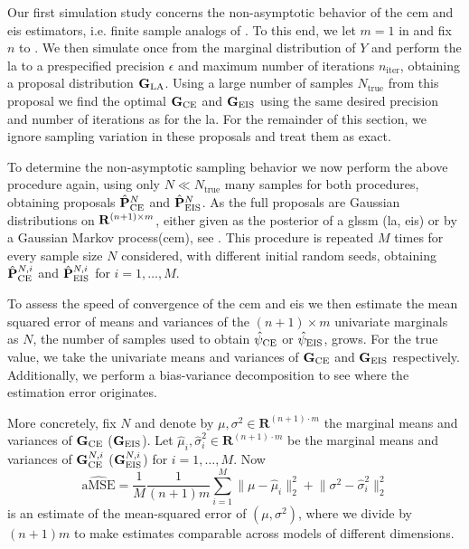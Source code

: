 
Our first simulation study concerns the non-asymptotic behavior of the \gls{cem} and \gls{eis} estimators, i.e. finite sample analogs of . To this end,
we let $m = 1$ in  and fix $n$ to . 
We then simulate once from the marginal distribution of $Y$ and perform the \gls{la} to a prespecified precision $\epsilon$ and maximum number of iterations $n_{\text{iter}}$, obtaining a proposal distribution $\mathbf G_{{\text{LA}}}$. Using a large number of samples $N_{\text{true}}$ from this proposal we find the optimal $\mathbf G_{{\text{CE}}}$ and $\mathbf G_{{\text{EIS}}}$ using the same desired precision and number of iterations as for the \gls{la}. For the remainder of this section, we ignore sampling variation in these proposals and treat them as exact. 

To determine the non-asymptotic sampling behavior we now perform the above procedure again, using only $N \ll N_{\text{true}}$ many samples for both procedures, obtaining proposals $\hat{\mathbf P}^{N}_{{\text{CE}}}$ and $\hat {\mathbf P}^{N}_{{\text{EIS}}}$. As the full proposals are Gaussian distributions on $\mathbf R^{(n+1)\times m}$, either given as the posterior of a \gls{glssm} (\gls{la}, \gls{eis}) or by a Gaussian Markov process(\gls{cem}), see . 
This procedure is repeated $M$ times for every sample size $N$ considered, with different initial random seeds, obtaining $\hat{\mathbf P}^{N,i}_{{\text{CE}}}$ and $\hat {\mathbf P}^{N,i}_{{\text{EIS}}}$ for $i = 1, \dots, M$.

To assess the speed of convergence of the \gls{cem} and \gls{eis} we then estimate the mean squared error of means and variances of the $(n+1) \times m$ univariate marginals as $N$, the number of samples used to obtain ${\hat\psi_{\text{CE}}}$ or ${\hat\psi_{\text{EIS}}}$, grows. For the true value, we take the univariate means and variances of $\mathbf G_{{\text{CE}}}$ and $\mathbf G_{{\text{EIS}}}$ respectively. Additionally, we perform a bias-variance decomposition to see where the estimation error originates. 

More concretely, fix $N$ and denote by $\mu, \sigma^{2} \in \mathbf R^{(n + 1) \cdot m}$ the marginal means and variances of $\mathbf G_{{\text{CE}}}$ ($\mathbf G_{{\text{EIS}}}$). 
Let $\hat\mu_{i}, \hat\sigma^{2}_{i}\in\mathbf R^{(n + 1) \cdot m}$ be the marginal means and variances of $\mathbf G^{N,i}_{{\text{CE}}}$ ($\mathbf G^{N,i}_{{\text{EIS}}}$) for $i = 1,\dots, M$. 
Now 
$$
\widehat{\text{aMSE}} = \frac{1}{M} \frac{1}{(n + 1)m} \sum_{i = 1}^M \lVert \mu - \hat\mu_{i} \rVert_{2}^2 + \lVert \sigma^{2} - \hat\sigma_{i}^2 \rVert^{2}_{2}
$$
is an estimate of the mean-squared error of $(\mu, \sigma^{2})$, where we divide by $(n+1)m$ to make estimates comparable across models of different dimensions. 

